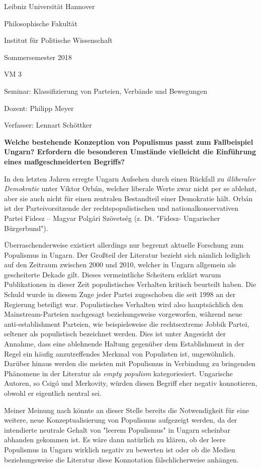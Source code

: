 \documentclass[11pt]{report}
\date{\today}
\title{}
\begin{document}
Leibniz	Universität Hannover	

Philosophische	Fakultät

Institut	für Politische	Wissenschaft

Sommersemester	2018

VM	3

Seminar:	Klassifizierung	von	Parteien,	Verbände und	Bewegungen

Dozent:	Philipp	Meyer

Verfasser:	Lennart Schöttker\newline



\Large \textbf{Welche bestehende Konzeption von Populismus passt zum Fallbeispiel Ungarn? Erfordern die besonderen Umstände vielleicht die Einführung eines maßgeschneiderten Begriffs?}

\normalsize
In den letzten Jahren erregte Ungarn Aufsehen durch einen Rückfall zu \emph{illiberaler Demokratie} unter Viktor Orbán, welcher liberale Werte zwar nicht per se ablehnt, aber sie auch nicht für einen zentralen Bestandteil einer Demokratie hält. Orbán ist der Parteivorsitzende der rechtspopulistischen und nationalkonservativen Partei Fidesz – Magyar Polgári Szövetség (z. Dt. "Fidesz- Ungarischer Bürgerbund").

Überraschenderweise existiert allerdings nur begrenzt aktuelle Forschung zum Populismus in Ungarn. Der Großteil der Literatur bezieht sich nämlich lediglich auf den Zeitraum zwischen 2000 und 2010, welcher in Ungarn allgemein als gescheiterte Dekade gilt. Dieses vermeintliche Scheitern erklärt warum Publikationen in dieser Zeit populistisches Verhalten kritisch beurteilt haben. Die Schuld wurde in diesem Zuge jeder Partei zugeschoben die seit 1998 an der Regierung beteiligt war. Populistisches Verhalten wird also hauptsächlich den Mainstream-Parteien nachgesagt beziehungsweise vorgeworfen, während neue anti-establishment Parteien, wie beispielsweise die rechtsextreme Jobbik Partei, seltener als populistisch bezeichnet werden. Dies ist unter Angesicht der Annahme, dass eine ablehnende Haltung gegenüber dem Establishment in der Regel ein häufig anzutreffendes Merkmal von Populisten ist, ungewöhnlich. Darüber hinaus werden die meisten mit Populismus in Verbindung zu bringenden Phänomene in der Literatur als \emph{empty populism} kategoriesiert. Ungarische Autoren, so Csigó und Merkovity, würden diesen Begriff eher negativ konnotieren, obwohl er eigentlich neutral sei.

Meiner Meinung nach könnte an dieser Stelle bereits die Notwendigkeit für eine weitere, neue Konzeptualisierung von Populismus aufgezeigt werden, da der intendierte neutrale Gehalt von "leerem Populismus" in Ungarn scheinbar abhanden gekommen ist. Es wäre dann natürlich zu klären, ob der leere Populismus in Ungarn wirklich negativ zu bewerten ist oder ob die Medien beziehungsweise die Literatur diese Konnotation fälschlicherweise anhängen.
\end{document}
